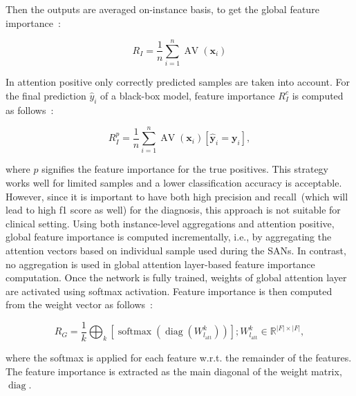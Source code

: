 \hspace*{3.5mm} Then the outputs are averaged on-instance basis, to get the global feature importance~\cite{vskrlj2020feature}: 

\begin{equation}
    R_{I}=\frac{1}{n} \sum_{i=1}^{n} \operatorname{AV}\left(\boldsymbol{x}_{i}\right)
\end{equation}

\hspace*{3.5mm} In attention positive only correctly predicted samples are taken into account. For the final prediction $\hat{y}_{i}$ of a black-box model, feature importance $R_{I}^{c}$ is computed as follows~\cite{vskrlj2020feature}:

\begin{equation}
    R_{I}^{p}=\frac{1}{n} \sum_{i=1}^{n} \operatorname{AV}\left(\boldsymbol{x}_{i}\right)\left[\hat{\boldsymbol{y}}_{i}=\boldsymbol{y}_{i}\right],
\end{equation}

\hspace*{3.5mm} where $p$ signifies the feature importance for the true positives. This strategy works well for limited samples and a lower classification accuracy is acceptable. However, since it is important to have both high precision and recall~(which will lead to high f1 score as well) for the diagnosis, this approach is not suitable for clinical setting. Using both instance-level aggregations and attention positive, global feature importance is computed incrementally, i.e., by aggregating the attention vectors based on individual sample used during the SANs. In contrast, no aggregation is used in global attention layer-based feature importance computation. Once the network is fully trained, weights of global attention layer are activated using softmax activation. Feature importance is then computed from the weight vector as follows~\cite{vskrlj2020feature}:

\begin{equation}
    R_{G}=\frac{1}{k} \bigoplus_{k}\left[\operatorname{softmax}\left(\operatorname{diag}\left(W_{l_{\mathrm{att}}}^{k}\right)\right)\right] ; W_{l_{\mathrm{att}}}^{k} \in \mathbb{R}^{|F| \times|F|},
    \label{eq:gal_k}
\end{equation}

\hspace*{3.5mm} where the softmax is applied for each feature w.r.t. the remainder of the features. The feature importance is extracted as the main diagonal of the weight matrix, $\operatorname{diag}$. 

